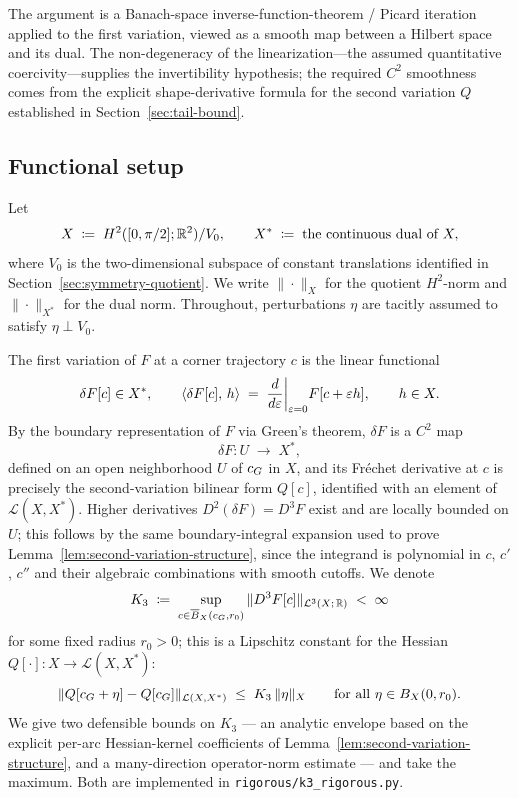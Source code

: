 The argument is a Banach-space inverse-function-theorem / Picard
iteration applied to the first variation, viewed as a smooth map
between a Hilbert space and its dual.  The
non-degeneracy of the linearization---the assumed
quantitative coercivity---supplies the invertibility hypothesis; the
required $C^{2}$ smoothness comes from the explicit shape-derivative
formula for the second variation $Q$ established in
Section~\ref{sec:tail-bound}.

\subsection{Functional setup}

Let
\[
   X \;\coloneqq\; H^{2}([0,\pi/2];\mathbb{R}^{2})/V_{0}, \qquad
   X^{*} \;\coloneqq\; \text{the continuous dual of } X,
\]
where $V_{0}$ is the two-dimensional subspace of constant translations
identified in Section~\ref{sec:symmetry-quotient}.  We write
$\|\cdot\|_{X}$ for the quotient $H^{2}$-norm and $\|\cdot\|_{X^{*}}$
for the dual norm.  Throughout, perturbations $\eta$ are tacitly
assumed to satisfy $\eta \perp V_{0}$.

The first variation of $F$ at a corner trajectory $c$ is the linear
functional
\[
   \delta F[c] \in X^{*}, \qquad
   \langle \delta F[c],\, h\rangle
     \;=\; \frac{d}{d\varepsilon}\bigg|_{\varepsilon=0} F[c + \varepsilon h],
   \qquad h \in X.
\]
By the boundary representation of $F$ via Green's theorem, $\delta F$
is a $C^{2}$ map
\begin{equation}\label{eq:dF-smoothness}
   \delta F \colon U \;\longrightarrow\; X^{*},
\end{equation}
defined on an open neighborhood $U$ of $c_{G}$ in $X$, and its Fr\'echet
derivative at $c$ is precisely the second-variation bilinear form
$Q[c]$, identified with an element of $\mathcal{L}(X, X^{*})$.  Higher
derivatives $D^{2}(\delta F) = D^{3}F$ exist and are locally bounded
on $U$; this follows by the same boundary-integral expansion used to
prove Lemma~\ref{lem:second-variation-structure}, since the integrand
is polynomial in $c$, $c'$, $c''$ and their algebraic combinations
with smooth cutoffs.  We denote
\begin{equation}\label{eq:K3-def}
   K_{3} \;\coloneqq\; \sup_{c \in \overline{B}_{X}(c_{G}, r_{0})}
       \|D^{3}F[c]\|_{\mathcal{L}^{3}(X;\, \mathbb{R})}
   \;<\; \infty
\end{equation}
for some fixed radius $r_{0}>0$; this is a Lipschitz constant for the
Hessian $Q[\cdot]\colon X \to \mathcal{L}(X,X^{*})$:
\begin{equation}\label{eq:Q-lipschitz}
   \|Q[c_{G} + \eta] - Q[c_{G}]\|_{\mathcal{L}(X, X^{*})}
   \;\leq\; K_{3}\, \|\eta\|_{X}
   \qquad \text{for all } \eta \in B_{X}(0, r_{0}).
\end{equation}
We give two defensible bounds on $K_{3}$ --- an analytic
envelope based on the explicit per-arc Hessian-kernel
coefficients of Lemma~\ref{lem:second-variation-structure}, and a
many-direction operator-norm estimate --- and take the maximum.
Both are implemented in \texttt{rigorous/k3\_rigorous.py}.

